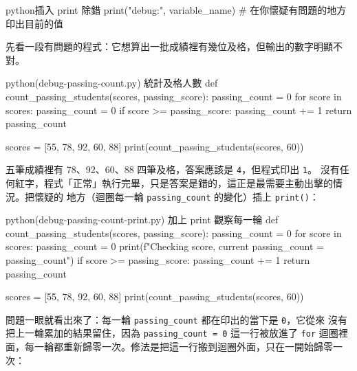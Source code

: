 \begin{code}{python}{插入 print 除錯}
print("debug:", variable_name)     # 在你懷疑有問題的地方印出目前的值
\end{code}

先看一段有問題的程式：它想算出一批成績裡有幾位及格，但輸出的數字明顯不對。

\begin{example}{python}{(debug-passing-count.py) 統計及格人數}
def count_passing_students(scores, passing_score):
    passing_count = 0
    for score in scores:
        passing_count = 0
        if score >= passing_score:
            passing_count += 1
    return passing_count

scores = [55, 78, 92, 60, 88]
print(count_passing_students(scores, 60))
\end{example}


五筆成績裡有 78、92、60、88 四筆及格，答案應該是 \texttt{4}，但程式印出 \texttt{1}。
沒有任何紅字，程式「正常」執行完畢，只是答案是錯的，這正是最需要主動出擊的情況。把懷疑的
地方（迴圈每一輪 \texttt{passing\_count} 的變化）插上 \texttt{print()}：

\begin{example}{python}{(debug-passing-count-print.py) 加上 print 觀察每一輪}
def count_passing_students(scores, passing_score):
    passing_count = 0
    for score in scores:
        passing_count = 0
        print(f"Checking {score}, current passing_count = {passing_count}")
        if score >= passing_score:
            passing_count += 1
    return passing_count

scores = [55, 78, 92, 60, 88]
print(count_passing_students(scores, 60))
\end{example}


問題一眼就看出來了：每一輪 \texttt{passing\_count} 都在印出的當下是 \texttt{0}，它從來
沒有把上一輪累加的結果留住，因為 \texttt{passing\_count = 0} 這一行被放進了 \texttt{for}
迴圈裡面，每一輪都重新歸零一次。修法是把這一行搬到迴圈外面，只在一開始歸零一次：

